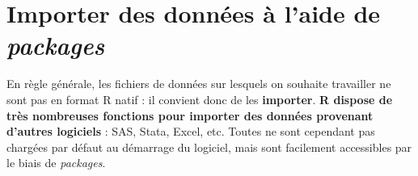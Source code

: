 \documentclass[12pt,twosided, notitlepage]{book}
\newenvironment{Shaded}{}{}
\newcommand{\KeywordTok}[1]{\textcolor[rgb]{0.00,0.00,1.00}{{#1}}}
\newcommand{\DataTypeTok}[1]{{#1}}
\newcommand{\CharTok}[1]{\textcolor[rgb]{0.00,0.50,0.50}{{#1}}}
\newcommand{\StringTok}[1]{\textcolor[rgb]{0.00,0.50,0.50}{{#1}}}
\newcommand{\CommentTok}[1]{\textcolor[rgb]{0.00,0.50,0.00}{{#1}}}
\newcommand{\NormalTok}[1]{{#1}}
\newif \ifsol
\renewenvironment{Shaded}{\begin{snugshade}}{\end{snugshade}}
\begin{document}
\begin{enumerate}
  \ifsol 

  \begin{center} \rule{0.5\linewidth}{\linethickness}\end{center}

\begin{Shaded}
\begin{Highlighting}[]
\CommentTok{# Plusieurs méthodes existent pour calculer un pourcentage}
\CommentTok{# à partir d'un objet de table(). La plus simple est}
\CommentTok{# de diviser par la taille totale de la population}
\CommentTok{# calculée à la question b.}
\KeywordTok{by}\NormalTok{(rp$IPONDI, rp$SEXE, sum)/}\KeywordTok{sum}\NormalTok{(rp$IPONDI)}
  \NormalTok{## rp$SEXE: 1}
  \NormalTok{## [1] 0.4767335}
  \NormalTok{## ------------------------------------------------ }
  \NormalTok{## rp$SEXE: 2}
  \NormalTok{## [1] 0.5232665}

\CommentTok{# Pour représenter ces données avec un diagramme}
\CommentTok{# circulaire, on utilise la fonction pie()}
\KeywordTok{pie}\NormalTok{(}
  \KeywordTok{by}\NormalTok{(rp$IPONDI, rp$SEXE, sum)/}\KeywordTok{sum}\NormalTok{(rp$IPONDI)}
  \NormalTok{, }\DataTypeTok{main =} \StringTok{"Hommes et femmes dans les Hauts-de-Seine}\CharTok{\textbackslash{}n}\StringTok{au RP 2013"}
\NormalTok{)}
\end{Highlighting}
\end{Shaded}

  \begin{center}\texttt{[image: livret\_files/figure-latex/rp\_pie-1]} \end{center}

  \begin{center} \rule{0.5\linewidth}{\linethickness}\end{center}

  \bigskip  \fi 
\end{enumerate}

\section{\texorpdfstring{Importer des données à l'aide de
\emph{packages}}{Importer des données à l'aide de packages}}\label{importer-des-donnees-a-laide-de-packages}

En règle générale, les fichiers de données sur lesquels on souhaite
travailler ne sont pas en format R natif : il convient donc de les
\textbf{importer}. \textbf{R dispose de très nombreuses fonctions pour
importer des données provenant d'autres logiciels} : SAS, Stata, Excel,
etc. Toutes ne sont cependant pas chargées par défaut au démarrage du
logiciel, mais sont facilement accessibles par le biais de
\emph{packages}.
\end{document}
